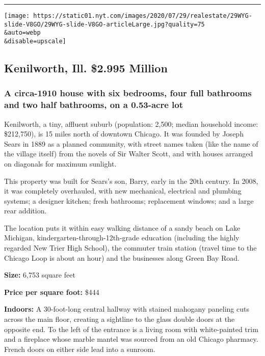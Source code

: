 \begin{center}\rule{0.5\linewidth}{\linethickness}\end{center}

\texttt{[image: https://static01.nyt.com/images/2020/07/29/realestate/29WYG-slide-V8GO/29WYG-slide-V8GO-articleLarge.jpg?quality=75\\\&auto=webp\\\&disable=upscale]}

\hypertarget{kenilworth-ill--2995-million}{%
\subsection{Kenilworth, Ill. \textbar{} \$2.995
Million}\label{kenilworth-ill--2995-million}}

\hypertarget{a-circa-1910-house-with-six-bedrooms-four-full-bathrooms-and-two-half-bathrooms-on-a-053-acre-lot}{%
\subsubsection{\texorpdfstring{\textbf{A circa-1910 house with six
bedrooms, four full bathrooms and two half bathrooms, on a 0.53-acre
lot}}{A circa-1910 house with six bedrooms, four full bathrooms and two half bathrooms, on a 0.53-acre lot}}\label{a-circa-1910-house-with-six-bedrooms-four-full-bathrooms-and-two-half-bathrooms-on-a-053-acre-lot}}

Kenilworth, a tiny, affluent suburb (population: 2,500; median household
income: \$212,750), is 15 miles north of downtown Chicago. It was
founded by Joseph Sears in 1889 as a planned community, with street
names taken (like the name of the village itself) from the novels of Sir
Walter Scott, and with houses arranged on diagonals for maximum
sunlight.

This property was built for Sears's son, Barry, early in the 20th
century. In 2008, it was completely overhauled, with new mechanical,
electrical and plumbing systems; a designer kitchen; fresh bathrooms;
replacement windows; and a large rear addition.

The location puts it within easy walking distance of a sandy beach on
Lake Michigan, kindergarten-through-12th-grade education (including the
highly regarded New Trier High School), the commuter train station
(travel time to the Chicago Loop is about an hour) and the businesses
along Green Bay Road.

\textbf{Size:} 6,753 square feet

\textbf{Price per square foot:} \$444

\textbf{Indoors:} A 30-foot-long central hallway with stained mahogany
paneling cuts across the main floor, creating a sightline to the glass
double doors at the opposite end. To the left of the entrance is a
living room with white-painted trim and a fireplace whose marble mantel
was sourced from an old Chicago pharmacy. French doors on either side
lead into a sunroom.

